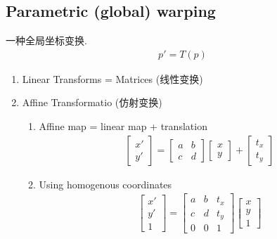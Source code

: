  \subsection{Parametric (global) warping}
 一种全局坐标变换. 
 \begin{align*}
    p'=T(p)
 \end{align*}
 \begin{enumerate}
    \item Linear Transforms = Matrices (线性变换)
    \item Affine Transformatio (仿射变换)
    \begin{enumerate}
        \item Affine map = linear map + translation
        \begin{align*}
            \begin{bmatrix}
                x'\\y'
            \end{bmatrix}=\begin{bmatrix}
                a&b\\c&d
            \end{bmatrix}\begin{bmatrix}
                x\\y
            \end{bmatrix}+\begin{bmatrix}
                t_x\\t_y
            \end{bmatrix}
        \end{align*}
        \item Using homogenous coordinates
        \begin{align*}
            \begin{bmatrix}
                x'\\y'\\1
            \end{bmatrix}=\begin{bmatrix}
                a&b&t_x\\c&d&t_y\\0&0&1
            \end{bmatrix}\begin{bmatrix}
                x\\y\\1
            \end{bmatrix}
        \end{align*}


\end{enumerate}
\end{enumerate}
